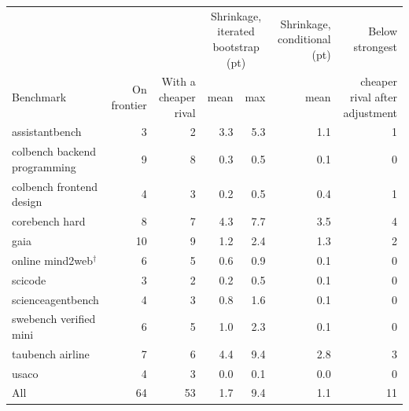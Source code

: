 \begin{tabular}{lrrrrrr}
\toprule
 & & & \multicolumn{2}{c}{Shrinkage, iterated bootstrap (pt)} & Shrinkage, conditional (pt) & Below strongest \\
Benchmark & On frontier & With a cheaper rival & mean & max & mean & cheaper rival after adjustment \\
\midrule
assistantbench & 3 & 2 & 3.3 & 5.3 & 1.1 & 1 \\
colbench backend programming & 9 & 8 & 0.3 & 0.5 & 0.1 & 0 \\
colbench frontend design & 4 & 3 & 0.2 & 0.5 & 0.4 & 1 \\
corebench hard & 8 & 7 & 4.3 & 7.7 & 3.5 & 4 \\
gaia & 10 & 9 & 1.2 & 2.4 & 1.3 & 2 \\
online mind2web$^{\dagger}$ & 6 & 5 & 0.6 & 0.9 & 0.1 & 0 \\
scicode & 3 & 2 & 0.2 & 0.5 & 0.1 & 0 \\
scienceagentbench & 4 & 3 & 0.8 & 1.6 & 0.1 & 0 \\
swebench verified mini & 6 & 5 & 1.0 & 2.3 & 0.1 & 0 \\
taubench airline & 7 & 6 & 4.4 & 9.4 & 2.8 & 3 \\
usaco & 4 & 3 & 0.0 & 0.1 & 0.0 & 0 \\
\midrule
All & 64 & 53 & 1.7 & 9.4 & 1.1 & 11 \\
\bottomrule
\end{tabular}
